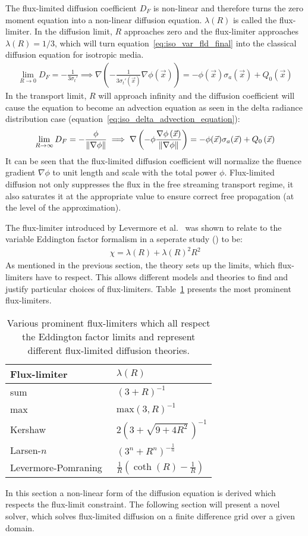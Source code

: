 The flux-limited diffusion coefficient $D_F$ is non-linear and therefore turns the zero moment equation into a non-linear diffusion equation. $\lambda(R)$ is called the flux-limiter. In the diffusion limit, $R$ approaches zero and the flux-limiter approaches $\lambda(R)=1/3$, which will turn equation~\ref{eq:iso_var_fld_final} into the classical diffusion equation for isotropic media.
\begin{align}
\lim_{R\rightarrow 0 }D_F =-\frac{1}{3\sigma_t'}
\implies
\nabla
\left(
-\frac{1}{3\sigma_t'\left(\vec{x}\right)}
\nabla \phi\left(\vec{x}\right)
\right)
=
-\phi(\vec{x})\sigma_a(\vec{x})
+Q_0\left(\vec{x}\right)
\end{align}
In the transport limit, $R$ will approach infinity and the diffusion coefficient will cause the equation to become an advection equation as seen in the delta radiance distribution case (equation~\ref{eq:iso_delta_advection_equation}):
\begin{align}
\lim_{R\rightarrow\infty }D_F =-\frac{\phi}{\left\lVert\nabla\phi\right\rVert}
\implies
\nabla
\left(
-\phi\frac{\nabla\phi\left(\vec{x}\right)}{\left\lVert\nabla\phi\right\rVert}
\right)
=
-\phi(\vec{x})\sigma_a(\vec{x})
+Q_0\left(\vec{x}\right)
\end{align}
It can be seen that the flux-limited diffusion coefficient will normalize the fluence gradient $\nabla\phi$ to unit length and scale with the total power $\phi$. Flux-limited diffusion not only suppresses the flux in the free streaming transport regime, it also saturates it at the appropriate value to ensure correct free propagation (at the level of the approximation).

The flux-limiter introduced by Levermore et al.~\cite{Levermore81} was shown to relate to the variable Eddington factor formalism in a seperate study (\cite{Whalen82, Levermore84}) to be:
\begin{align}
\label{eq:iso_var_fld_vef}
\chi = \lambda(R) + \lambda(R)^2R^2
\end{align}
As mentioned in the previous section, the theory sets up the limits, which flux-limiters have to respect. This allows different models and theories to find and justify particular choices of flux-limiters. Table~\ref{tbl:flux-limiters} presents the most prominent flux-limiters.
\begin{table}[h]
\center
\caption{Various prominent flux-limiters which all respect the Eddington factor limits and represent different flux-limited diffusion theories.}
\begin{tabular}{ l l }
\hline\hline
 Flux-limiter & $\lambda\left(R\right)$ \\ 
\hline
 sum~\cite{Bowers82} & $(3+R)^{-1}$ \\
 max~\cite{Bowers82} & $\mbox{max}(3, R)^{-1}$ \\
 Kershaw~\cite{Kershaw76} & $2(3+\sqrt{9 + 4R^2}\,)^{-1}$ \\
 Larsen-$n$~\cite{Larsen74} & $(3^n + R^n)^{-\frac{1}{n}}$ \\
 Levermore-Pomraning~\cite{Levermore81} & $\frac{1}{R} \left(\coth(R)-\frac{1}{R}\right)$    
\end{tabular}
\label{tbl:flux-limiters}
\end{table}

In this section a non-linear form of the diffusion equation is derived which respects the flux-limit constraint. The following section will present a novel solver, which solves flux-limited diffusion on a finite difference grid over a given domain.